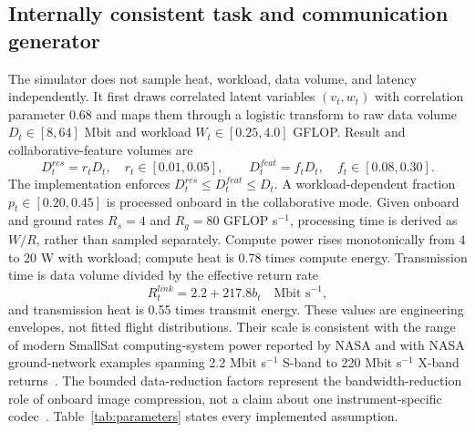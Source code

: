 \documentclass[11pt]{article}
\begin{document}
\begin{table}[H]
\centering
\color{red}%
\caption{Implemented 15-dimensional task descriptor dictionary. The complete 24-dimensional observation appends normalized time, sine and cosine of link phase, and six resource coordinates: $h$, $e$, $q$, compute utilization $u$, bandwidth $b$, and contact duration $\tau$.}
\color{black}%
\label{tab:state_dictionary}
\resizebox{\textwidth}{!}{}
\end{table}

\color{red}%
\subsection{Internally consistent task and communication generator}
\color{black}%

\color{red}%
The simulator does not sample heat, workload, data volume, and latency independently. It first draws correlated latent variables $(v_t,w_t)$ with correlation parameter 0.68 and maps them through a logistic transform to raw data volume $D_t\in[8,64]$ Mbit and workload $W_t\in[0.25,4.0]$ GFLOP. Result and collaborative-feature volumes are
\color{black}%
\begin{equation}
D_t^{res}=r_tD_t,\quad r_t\in[0.01,0.05],\qquad
D_t^{feat}=f_tD_t,\quad f_t\in[0.08,0.30].
\end{equation}
The implementation enforces $D_t^{res}\le D_t^{feat}\le D_t$. A workload-dependent fraction $p_t\in[0.20,0.45]$ is processed onboard in the collaborative mode. Given onboard and ground rates $R_s=4$ and $R_g=80$ GFLOP s$^{-1}$, processing time is derived as $W/R$, rather than sampled separately. Compute power rises monotonically from 4 to 20 W with workload; compute heat is 0.78 times compute energy. Transmission time is data volume divided by the effective return rate
\begin{equation}
R_t^{link}=2.2+217.8b_t\quad\text{Mbit s}^{-1},
\end{equation}
and transmission heat is 0.55 times transmit energy. These values are engineering envelopes, not fitted flight distributions. Their scale is consistent with the range of modern SmallSat computing-system power reported by NASA and with NASA ground-network examples spanning 2.2 Mbit s$^{-1}$ S-band to 220 Mbit s$^{-1}$ X-band returns~\cite{nasa2026avionics,nasa2026ground}. The bounded data-reduction factors represent the bandwidth-reduction role of onboard image compression, not a claim about one instrument-specific codec~\cite{ccsds122}. Table~\ref{tab:parameters} states every implemented assumption.
\end{document}
